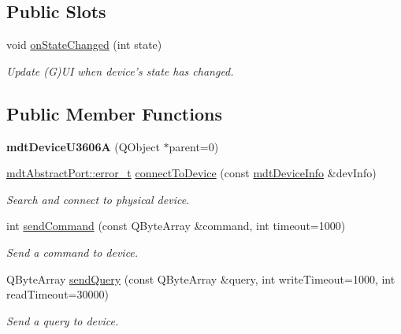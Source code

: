 \subsection*{Public Slots}
\begin{DoxyCompactItemize}
\item 
\hypertarget{classmdt_device_u3606_a_a94a6f8b3f64cd35b33204c66816f3f6a}{
void \hyperlink{classmdt_device_u3606_a_a94a6f8b3f64cd35b33204c66816f3f6a}{onStateChanged} (int state)}
\label{classmdt_device_u3606_a_a94a6f8b3f64cd35b33204c66816f3f6a}

\begin{DoxyCompactList}\small\item\em Update (G)UI when device's state has changed. \end{DoxyCompactList}\end{DoxyCompactItemize}
\subsection*{Public Member Functions}
\begin{DoxyCompactItemize}
\item 
\hypertarget{classmdt_device_u3606_a_a91201ae14df7b553a947b5857eaa1c65}{
{\bfseries mdtDeviceU3606A} (QObject $\ast$parent=0)}
\label{classmdt_device_u3606_a_a91201ae14df7b553a947b5857eaa1c65}

\item 
\hyperlink{classmdt_abstract_port_ad4121bb930c95887e77f8bafa065a85e}{mdtAbstractPort::error\_\-t} \hyperlink{classmdt_device_u3606_a_acf3b48b13bc179ad4f94b3011b7d607a}{connectToDevice} (const \hyperlink{classmdt_device_info}{mdtDeviceInfo} \&devInfo)
\begin{DoxyCompactList}\small\item\em Search and connect to physical device. \end{DoxyCompactList}\item 
int \hyperlink{classmdt_device_u3606_a_aa9045c25f6be6797b21ea98b4958e8f1}{sendCommand} (const QByteArray \&command, int timeout=1000)
\begin{DoxyCompactList}\small\item\em Send a command to device. \end{DoxyCompactList}\item 
QByteArray \hyperlink{classmdt_device_u3606_a_a637c4b440e9c4905c11c16a056e2c7ad}{sendQuery} (const QByteArray \&query, int writeTimeout=1000, int readTimeout=30000)
\begin{DoxyCompactList}\small\item\em Send a query to device. \end{DoxyCompactList}\end{DoxyCompactItemize}


